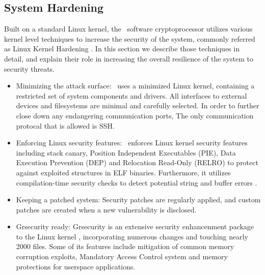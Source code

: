 \subsection{System Hardening}
\label{sec:sys-hardening}
Built on a standard Linux kernel, the \vcage\ software cryptoprocessor utilizes various kernel level techniques to increase the security of the system, commonly referred as Linux Kernel Hardening \cite{SANS-hardening:2003}. In this section we describe those techniques in detail, and explain their role in increasing the overall resilience of the system to security threats.

\begin{itemize}
  \item Minimizing the attack surface: \vcage\ uses a minimized Linux kernel, containing a restricted set of system components and drivers. All interfaces to external devices and filesystems are minimal and carefully selected. In order to further close down any endangering communication ports, The only communication protocal that is allowed is SSH.
  \item Enforcing Linux security features: \vcage\ enforces Linux kernel security features including stack canary, Position Independent Executables (PIE), Data Execution Prevention (DEP) and Relocation Read-Only (RELRO) to protect against exploited structures in ELF binaries. Furthermore, it utilizes compilation-time security checks to detect potential string and buffer errors \cite{gcc-fortify}.
  \item Keeping a patched system: Security patches are regularly applied, and custom patches are created when a new vulnerability is disclosed.
  \item Grsecurity ready: Grsecurity is an extensive security enhancenment package to the Linux kernel \cite{Grsec}, incorporating numerous changes and touching nearly 2000 files. Some of its features include mitigation of common memory corruption exploits, Mandatory Access Control system and memory protections for userspace applications.
\end{itemize}
